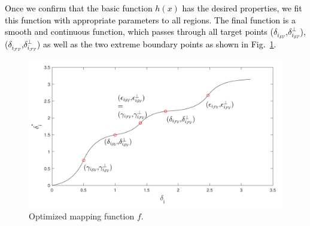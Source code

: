 \textcolor{black}{Once we confirm that the basic function $h(x)$ has the desired properties, we fit this function with appropriate parameters to all regions. The final function is a smooth and continuous function, which passes through all target points ($\delta_{i_{{\mathcal{SV}}}}$,$\delta^{\perp}_{i_{{\mathcal{SV}}}}$), ($\delta_{i_{{\mathcal{FV}}}}$,$\delta^{\perp}_{i_{{\mathcal{FV}}}}$) as well as the two extreme boundary points as shown in Fig.~\ref{fig:optimized_map}.}





\begin{figure}[t]
\centering
\includegraphics[scale=.7]{Fig/optimized_mapping_f.pdf}
\caption{Optimized mapping function $f$.}
\label{fig:optimized_map}
\end{figure}

